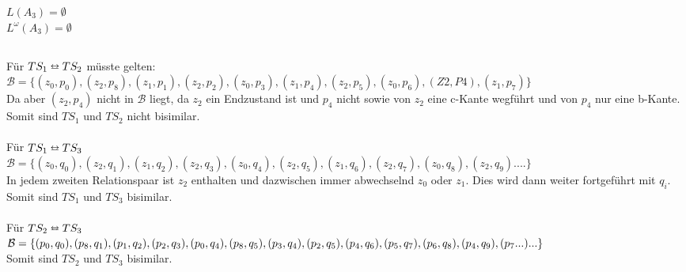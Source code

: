 \documentclass[a4paper,12pt]{scrartcl}
\begin{document}
\subsubsection{}
$L(A_{3}) = \emptyset$\\
$L^\omega(A_{3}) = \emptyset$\\

\subsection{}
\subsubsection{}
Für $TS_1 \leftrightarroweq TS_2$ müsste gelten:\\
$\mathcal{B} = \{(z_0,p_0),(z_2,p_8),(z_1,p_1),(z_2,p_2),(z_0,p_3),(z_1,p_4),(z_2,p_5),(z_0,p_6),(Z2,P4),(z_1,p_7)\}$\\
Da aber $(z_2,p_4)$ nicht in $\mathcal{B}$ liegt, da $z_2$ ein Endzustand ist und $p_4$ nicht sowie von $z_2$ eine c-Kante wegführt und von $p_4$ nur eine b-Kante. Somit sind $TS_1$ und $TS_2$ nicht bisimilar.\\\\
Für $TS_1 \leftrightarroweq TS_3$\\
$\mathcal{B} = \{(z_0,q_0),(z_2,q_1),(z_1,q_2),(z_2,q_3),(z_0,q_4),(z_2,q_5),(z_1,q_6),(z_2,q_7),(z_0,q_8),(z_2,q_9)....\}$\\
In jedem zweiten Relationspaar ist $z_2$ enthalten und dazwischen immer abwechselnd $z_0$ oder $z_1$. Dies wird dann weiter fortgeführt mit $q_i$.
Somit sind $TS_1$ und $TS_3$ bisimilar.\\\\
Für $TS_2 \leftrightarroweq TS_3$\\
$\mathcal{B} = \{(p_0,q_0),(p_8,q_1),(p_1,q_2),(p_2,q_3),(p_0,q_4),(p_8,q_5),(p_3,q_4),(p_2,q_5),(p_4,q_6)\\,(p_5,q_7),(p_6,q_8),(p_4,q_9),(p_7...)...\}$\\
Somit sind $TS_2$ und $TS_3$ bisimilar.\\\\
\end{document}
